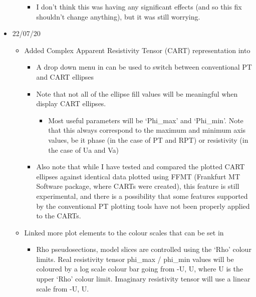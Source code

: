 \documentclass[letterpaper,10pt,english]{sphinxmanual}
\begin{document}
\begin{itemize}
\begin{itemize}
\begin{itemize}
\item {} 
I don’t think this was having any significant effects (and so this fix shouldn’t change anything), but it was still worrying.

\end{itemize}

\end{itemize}

\item {} 
22/07/20
\begin{itemize}
\item {} 
Added Complex Apparent Resistivity Tensor (CART) representation into {\hyperref[\detokenize{content/data_plot/map_viewer:map-viewer}]{}}
\begin{itemize}
\item {} 
A drop down menu in {\hyperref[\detokenize{content/data_plot/map_viewer:map-viewer}]{}} can be used to switch between conventional PT and CART ellipses

\item {} 
Note that not all of the ellipse fill values will be meaningful when display CART ellipses.
\begin{itemize}
\item {} 
Most useful parameters will be ‘Phi\_max’ and ‘Phi\_min’. Note that this always correspond to the maximum and minimum axis values, be it phase (in the case of PT and RPT) or resistivity (in the case of Ua and Va)

\end{itemize}

\item {} 
Also note that while I have tested and compared the plotted CART ellipses against identical data plotted using FFMT (Frankfurt MT Software package, where CARTs were created), this feature is still experimental, and there is a possibility that some features supported by the conventional PT plotting tools have not been properly applied to the CARTs.

\end{itemize}

\item {} 
Linked more plot elements to the colour scales that can be set in {\hyperref[\detokenize{content/data_plot/map_viewer:map-viewer}]{}}
\begin{itemize}
\item {} 
Rho pseudosections, model slices are controlled using the ‘Rho’ colour limits. Real resistivity tensor phi\_max / phi\_min values will be coloured by a log scale colour bar going from -U, U, where U is the upper ‘Rho’ colour limit. Imaginary resistivity tensor will use a linear scale from -U, U.


\end{itemize}
\end{itemize}
\end{itemize}
\end{document}
